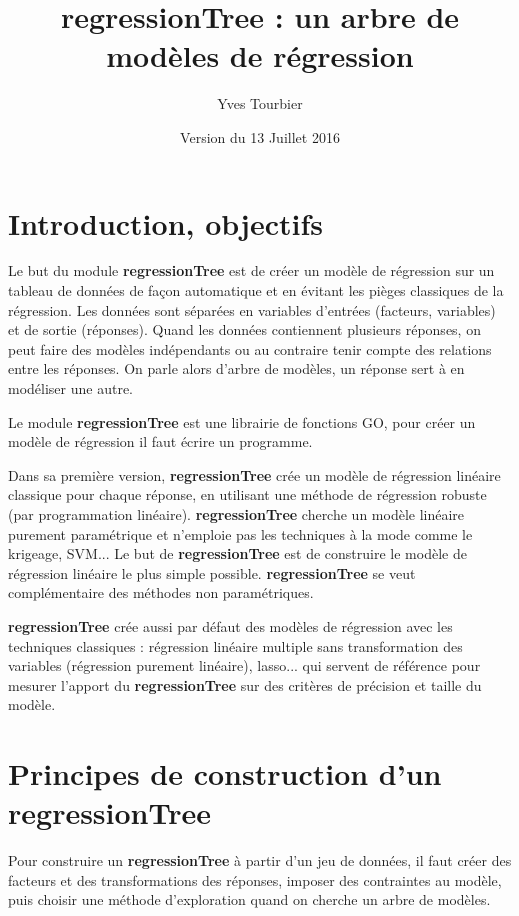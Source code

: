 \documentclass{article}
\title{\textbf{regressionTree} : un arbre de modèles de régression}
\author{Yves Tourbier}
\date{Version du 13 Juillet 2016}
\newcommand{\regt}{\textbf{regressionTree }}
\begin{document}
\maketitle
\tableofcontents



\section{Introduction, objectifs}

Le but du module \regt est de créer un modèle de régression sur un tableau de données de façon automatique et en évitant les pièges classiques de la régression. Les données sont séparées en variables d'entrées (facteurs, variables) et de sortie (réponses). Quand les données contiennent plusieurs réponses, on peut faire des modèles indépendants ou au contraire tenir compte des relations entre les réponses. On parle alors d'arbre de modèles, un réponse sert à en modéliser une autre.\newline

Le module \regt est une librairie de fonctions GO, pour créer un modèle de régression il faut écrire un programme.\newline

Dans sa première version, \regt crée un modèle de régression linéaire classique pour chaque réponse, en utilisant une méthode de régression robuste (par programmation linéaire). \regt cherche un modèle linéaire purement paramétrique et n'emploie pas les techniques à la mode comme le krigeage, SVM... Le but de \regt est de construire le modèle de régression linéaire le plus simple possible. \regt se veut complémentaire des méthodes non paramétriques.\newline

\regt crée aussi par défaut des modèles de régression avec les techniques classiques : régression linéaire multiple sans transformation des variables (régression purement linéaire), lasso... qui servent de référence pour mesurer l'apport du \regt sur des critères de précision et taille du modèle.

\section{Principes de construction d'un \regt}

Pour construire un \regt à partir d'un jeu de données, il faut créer des facteurs et des transformations des réponses, imposer des contraintes au modèle, puis choisir une méthode d'exploration quand on cherche un arbre de modèles. \newline
\end{document}
